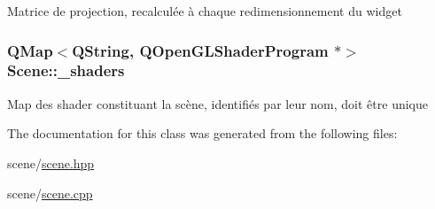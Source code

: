 Matrice de projection, recalculée à chaque redimensionnement du widget \hypertarget{class_scene_abde34dc03c8d3a07b3177041ab195f07}{
\subsubsection[{\+\_\+shaders}]{\setlength{\rightskip}{0pt plus 5cm}Q\+Map$<$Q\+String, Q\+Open\+G\+L\+Shader\+Program $\ast$$>$ Scene\+::\+\_\+shaders\hspace{0.3cm}{\ttfamily [private]}}}\label{class_scene_abde34dc03c8d3a07b3177041ab195f07}
Map des shader constituant la scène, identifiés par leur nom, doit être unique 

The documentation for this class was generated from the following files\+:\begin{DoxyCompactItemize}
\item 
scene/\hyperlink{scene_8hpp}{scene.\+hpp}\item 
scene/\hyperlink{scene_8cpp}{scene.\+cpp}\end{DoxyCompactItemize}
